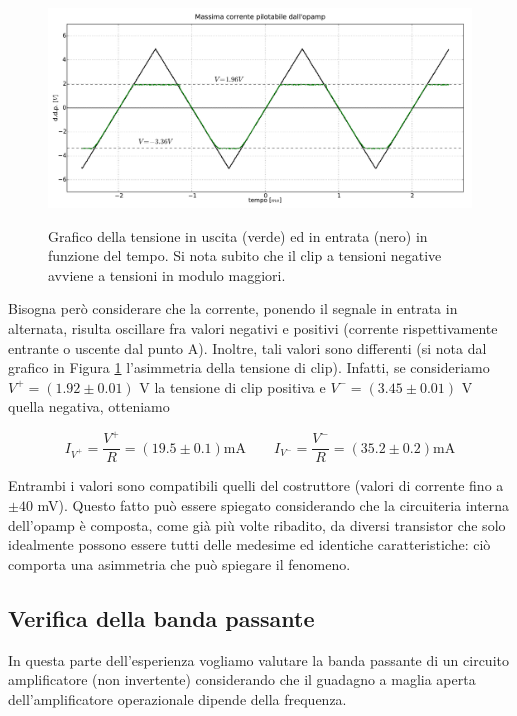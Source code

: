 \begin{figure}[ht]
 \centering
   {\includegraphics[width=\textwidth]{../E03/latex/clip.pdf}}
 \caption{Grafico della tensione in uscita (verde) ed in entrata (nero) in funzione del tempo. Si nota subito che il clip a tensioni negative avviene a tensioni in modulo maggiori.}
 \label{gr3:clip}
\end{figure}

Bisogna però considerare che la corrente, ponendo il segnale in entrata in alternata, risulta oscillare fra valori negativi e positivi (corrente rispettivamente entrante o uscente dal punto A). Inoltre, tali valori sono differenti (si nota dal grafico in Figura \ref{gr3:clip} l'asimmetria della tensione di clip). Infatti, se consideriamo $V^+ = (1.92 \pm 0.01)$ \si{\volt} la tensione di clip positiva e $V^- = (3.45 \pm 0.01)$ \si{\volt} quella negativa, otteniamo

$$I_{V^+} = \frac{V^+}{R} = (19.5 \pm 0.1) \si{\milli\ampere}  \qquad I_{V^-} = \frac{V^-}{R} = (35.2 \pm 0.2) \si{\milli\ampere}$$

Entrambi i valori sono compatibili quelli del costruttore (valori di corrente fino a $\pm 40$ \si{\milli\volt}). Questo fatto può essere spiegato considerando che la circuiteria interna dell'opamp è composta, come già più volte ribadito, da diversi transistor che solo idealmente possono essere tutti delle medesime ed identiche caratteristiche: ciò comporta una asimmetria che può spiegare il fenomeno.

\subsection{Verifica della banda passante}
\label{par3:bode}

In questa parte dell'esperienza vogliamo valutare la banda passante di un circuito amplificatore (non invertente) considerando che il guadagno a maglia aperta dell'amplificatore operazionale dipende della frequenza.

